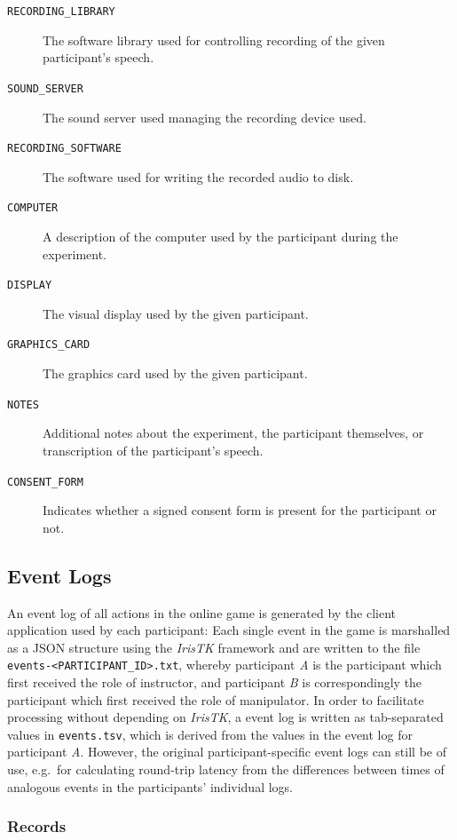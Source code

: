 \documentclass[USenglish]{article}
\newcommand{\scare}[1]{\textquote{#1}}	%
\newcommand{\inlinecode}[1]{\texttt{#1}}	%
\begin{document}
\begin{description}
	\item[\inlinecode{RECORDING\_LIBRARY}] The software library used for controlling recording of the given participant's speech.
	\item[\inlinecode{SOUND\_SERVER}] The sound server used managing the recording device used.
	\item[\inlinecode{RECORDING\_SOFTWARE}] The software used for writing the recorded audio to disk.
	\item[\inlinecode{COMPUTER}] A description of the computer used by the participant during the experiment.
	\item[\inlinecode{DISPLAY}] The visual display used by the given participant.
	\item[\inlinecode{GRAPHICS\_CARD}] The graphics card used by the given participant.
	\item[\inlinecode{NOTES}] Additional notes about the experiment, the participant themselves, or transcription of the participant's speech.
	\item[\inlinecode{CONSENT\_FORM}] Indicates whether a signed consent form is present for the participant or not.
\end{description}

\subsection{Event Logs}

An event log of all actions in the online game is generated by the client application used by each participant: Each single event in the game is marshalled as a JSON structure using the \emph{IrisTK} framework \autocite{Skantze&AlMoubayed:2012} and are written to the file \inlinecode{events-<PARTICIPANT\_ID>.txt}, whereby participant \emph{A} is the participant which first received the role of instructor, and participant \emph{B} is correspondingly the participant which first received the role of manipulator. In order to facilitate processing without depending on \emph{IrisTK}, a \scare{canonical} event log is written as tab-separated values \autocite{TSV} in \inlinecode{events.tsv}, which is derived from the values in the event log for participant \emph{A}. However, the original participant-specific event logs can still be of use, e.g.\ for calculating round-trip latency from the differences between times of analogous events in the participants' individual logs.

\subsubsection{Records}
\end{document}
